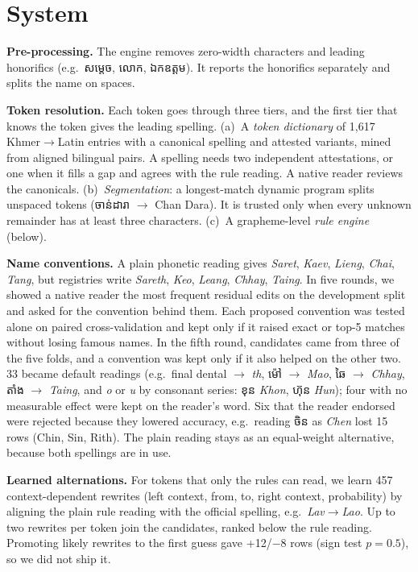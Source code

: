 \documentclass[10pt,twocolumn,a4paper]{article}
\newcommand{\kh}[1]{{\khmerfont #1}}
\begin{document}
\section{System}
\textbf{Pre-processing.} The engine removes zero-width characters and
leading honorifics (e.g.\ \kh{សម្តេច}, \kh{លោក}, \kh{ឯកឧត្តម}). It reports
the honorifics separately and splits the name on spaces.

\textbf{Token resolution.} Each token goes through three tiers, and the
first tier that knows the token gives the leading spelling.
(a)~A \emph{token dictionary} of 1,617 Khmer$\to$Latin entries with a
canonical spelling and attested variants, mined from aligned bilingual
pairs. A spelling needs two independent attestations, or one when it
fills a gap and agrees with the rule reading. A native reader reviews
the canonicals.
(b)~\emph{Segmentation}: a longest-match dynamic program splits unspaced
tokens (\kh{ចាន់ដារា} $\to$ Chan Dara). It is trusted only when
every unknown remainder has at least three characters.
(c)~A grapheme-level \emph{rule engine} (below).

\textbf{Name conventions.} A plain phonetic reading gives
\emph{Saret}, \emph{Kaev}, \emph{Lieng}, \emph{Chai}, \emph{Tang}, but
registries write \emph{Sareth}, \emph{Keo}, \emph{Leang}, \emph{Chhay},
\emph{Taing}. In five rounds, we showed a native reader the most
frequent residual edits on the development split and asked for the
convention behind them. Each proposed convention was tested alone on
paired cross-validation and kept only if it raised exact or top-5
matches without losing famous names. In the fifth round, candidates
came from three of the five folds, and a convention was kept only if it
also helped on the other two. 33 became default readings (e.g.\ final
dental $\to$ \emph{th}, \kh{ម៉ៅ} $\to$ \emph{Mao}, \kh{ឆៃ} $\to$
\emph{Chhay}, \kh{តាំង} $\to$ \emph{Taing}, and \emph{o} or \emph{u} by
consonant series: \kh{ខុន} \emph{Khon}, \kh{ហ៊ុន} \emph{Hun}); four
with no measurable effect were kept on the reader's word. Six that the
reader endorsed were rejected because they lowered accuracy, e.g.\
reading \kh{ចិន} as \emph{Chen} lost 15 rows (Chin, Sin, Rith). The
plain reading stays as an equal-weight alternative, because both
spellings are in use.

\textbf{Learned alternations.} For tokens that only the rules can read,
we learn 457 context-dependent rewrites (left context, from, to, right
context, probability) by aligning the plain rule reading with the
official spelling, e.g.\ \emph{Lav}$\to$\emph{Lao}. Up to two rewrites
per token join the candidates, ranked below the rule reading. Promoting
likely rewrites to the first guess gave +12/$-$8 rows (sign test
$p{=}0.5$), so we did not ship it.
\end{document}
